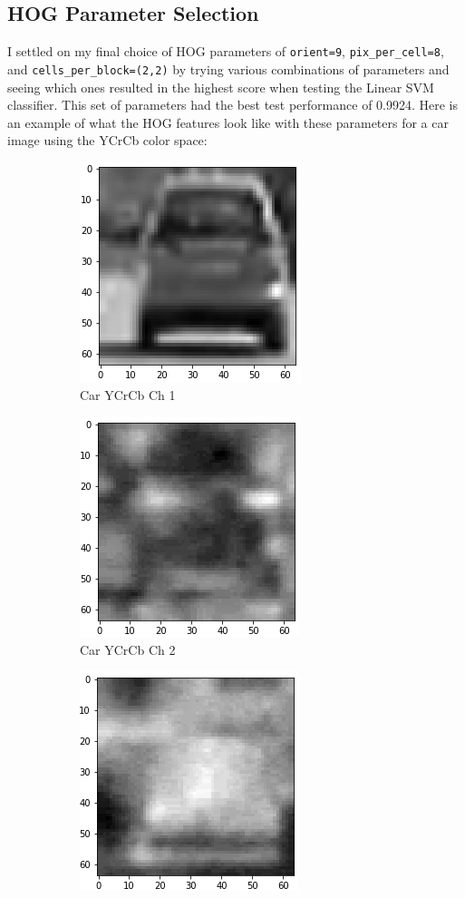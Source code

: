 \documentclass[12pt]{article}
\begin{document}
\subsection{HOG Parameter Selection}
I settled on my final choice of HOG parameters of \texttt{orient=9}, \texttt{pix\_per\_cell=8}, and \newline
\texttt{cells\_per\_block=(2,2)} by trying various combinations of parameters and seeing which ones resulted in the highest score when testing the Linear SVM classifier. This set of parameters had the best test performance of 0.9924. Here is an example of what the HOG features look like with these parameters for a car image using the YCrCb color space:
\begin{figure}[!h]
\centering
\begin{subfigure}{0.32\textwidth}
\centering
\includegraphics[scale=0.5]{car_ycrcb_ch1.png}
\caption{Car YCrCb Ch 1}
\end{subfigure}
\begin{subfigure}{0.32\textwidth}
\centering
\includegraphics[scale=0.5]{car_ycrcb_ch2.png}
\caption{Car YCrCb Ch 2}
\end{subfigure}
\begin{subfigure}{0.32\textwidth}
\centering
\includegraphics[scale=0.5]{car_ycrcb_ch3.png}

\end{subfigure}
\end{figure}
\end{document}
